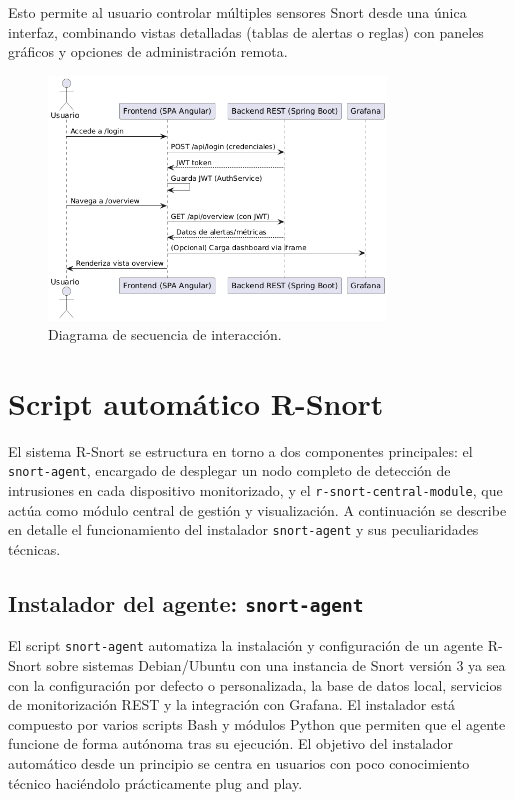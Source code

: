 \documentclass[11pt,a4paper,twoside]{report}
\begin{document}
Esto permite al usuario controlar múltiples sensores Snort desde una única interfaz, combinando vistas detalladas (tablas de alertas o reglas) con paneles gráficos y opciones de administración remota.

\begin{figure}[htb]
	\centering
	\includegraphics[width=0.8\textwidth]{documento/28.png}
	\caption{Diagrama de secuencia de interacción.}
	\label{fig:diagrama-secuencia-frontend}
\end{figure}

\section{Script automático R-Snort}

El sistema R-Snort se estructura en torno a dos componentes principales: el \texttt{snort-agent}, encargado de desplegar un nodo completo de detección de intrusiones en cada dispositivo monitorizado, y el \texttt{r-snort-central-module}, que actúa como módulo central de gestión y visualización. A continuación se describe en detalle el funcionamiento del instalador \texttt{snort-agent} y sus peculiaridades técnicas.

\subsection{Instalador del agente: \texttt{snort-agent}}

El script \texttt{snort-agent} automatiza la instalación y configuración de un agente R-Snort sobre sistemas Debian/Ubuntu con una instancia de Snort versión 3 ya sea con la configuración por defecto o personalizada, la base de datos local, servicios de monitorización REST y la integración con Grafana. El instalador está compuesto por varios scripts Bash y módulos Python que permiten que el agente funcione de forma autónoma tras su ejecución. El objetivo del instalador automático desde un principio se centra en usuarios con poco conocimiento técnico haciéndolo prácticamente plug and play.
\end{document}
